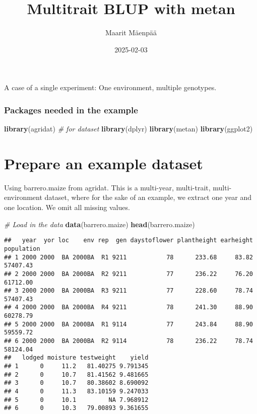 \documentclass[
]{article}
\title{Multitrait BLUP with metan}
\author{Maarit Mäenpää}
\date{2025-02-03}
\newenvironment{Shaded}{\begin{snugshade}}{\end{snugshade}}
\newcommand{\CommentTok}[1]{\textcolor[rgb]{0.56,0.35,0.01}{\textit{#1}}}
\newcommand{\FunctionTok}[1]{\textcolor[rgb]{0.13,0.29,0.53}{\textbf{#1}}}
\newcommand{\NormalTok}[1]{#1}
\begin{document}
\maketitle

A case of a single experiment: One environment, multiple genotypes.

\subsubsection{Packages needed in the
example}\label{packages-needed-in-the-example}

\begin{Shaded}
\begin{Highlighting}[]
\FunctionTok{library}\NormalTok{(agridat) }\CommentTok{\# for dataset}
\FunctionTok{library}\NormalTok{(dplyr)}
\FunctionTok{library}\NormalTok{(metan)}
\FunctionTok{library}\NormalTok{(ggplot2)}
\end{Highlighting}
\end{Shaded}

\section{Prepare an example dataset}\label{prepare-an-example-dataset}

Using barrero.maize from agridat. This is a multi-year, multi-trait,
multi-environment dataset, where for the sake of an example, we extract
one year and one location. We omit all missing values.

\begin{Shaded}
\begin{Highlighting}[]
\CommentTok{\# Load in the data}
\FunctionTok{data}\NormalTok{(barrero.maize)}
\FunctionTok{head}\NormalTok{(barrero.maize)}
\end{Highlighting}
\end{Shaded}

\begin{verbatim}
##   year  yor loc    env rep  gen daystoflower plantheight earheight population
## 1 2000 2000  BA 2000BA  R1 9211           78      233.68     83.82   57407.43
## 2 2000 2000  BA 2000BA  R2 9211           77      236.22     76.20   61712.00
## 3 2000 2000  BA 2000BA  R3 9211           77      228.60     78.74   57407.43
## 4 2000 2000  BA 2000BA  R4 9211           78      241.30     88.90   60278.79
## 5 2000 2000  BA 2000BA  R1 9114           77      243.84     88.90   59559.72
## 6 2000 2000  BA 2000BA  R2 9114           78      236.22     78.74   58124.04
##   lodged moisture testweight    yield
## 1      0     11.2   81.40275 9.791345
## 2      0     10.7   81.41562 9.481665
## 3      0     10.7   80.38602 8.690092
## 4      0     11.3   83.10159 9.247033
## 5      0     10.1         NA 7.968912
## 6      0     10.3   79.00893 9.361655
\end{verbatim}
\end{document}
